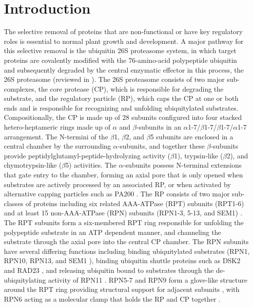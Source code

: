 \section{Introduction}
	The selective removal of proteins that are non-functional or have key regulatory roles is essential to normal plant growth and development. A major pathway for this selective removal is the ubiquitin 26S proteasome system, in which target proteins are covalently modified with the 76-amino-acid polypeptide ubiquitin and subsequently degraded by the central enzymatic effector in this process, the 26S proteasome (reviewed in \citep{finley09, livneh16, vierstra09}). The 26S proteasome consists of two major sub-complexes, the core protease (CP), which is responsible for degrading the substrate, and the regulatory particle (RP), which caps the CP at one or both ends and is responsible for recognizing and unfolding ubiquitylated substrates. Compositionally, the CP is made up of 28 subunits configured into four stacked hetero-heptameric rings made up of $\alpha$ and $\beta$-subunits in an $\alpha$1-7/$\beta$1-7/$\beta$1-7/$\alpha$1-7 arrangement. The N-termini of the $\beta$1, $\beta$2, and $\beta$5 subunits are enclosed in a central chamber by the surrounding $\alpha$-subunits, and together these $\beta$-subunits provide peptidylglutamyl-peptide-hydrolyzing activity ($\beta$1), trypsin-like ($\beta$2), and chymotrypsin-like ($\beta$5) activities. The $\alpha$-subunits possess N-terminal extensions that gate entry to the chamber, forming an axial pore that is only opened when substrates are actively processed by an associated RP, or when activated by alternative capping particles such as PA200 \citep{dange11, sadre-bazzaz10}. 
The RP consists of two major sub-classes of proteins including six related AAA-ATPase (RPT) subunits (RPT1-6) and at least 15 non-AAA-ATPase (RPN) subunits (RPN1-3, 5-13, and SEM1) \citep{finley09, paraskevopoulos14, russell13}. The RPT subunits form a six-membered RPT ring responsible for unfolding the polypeptide substrate in an ATP dependent manner, and channeling the substrate through the axial pore into the central CP chamber. The RPN subunits have several differing functions including binding ubiquitylated substrates (RPN1, RPN10, RPN13, and SEM1 \citep{elsasser04, paraskevopoulos14, schreiner08, shi16}), binding ubiquitin shuttle proteins such as DSK2 and RAD23 \citep{elsasser02, farmer10, fatimababy10, lin11}, and releasing ubiquitin bound to substrates through the de-ubiquitylating activity of RPN11 \citep{verma02, yao02}.  RPN5-7 and RPN9 form a glove-like structure around the RPT ring providing structural support for adjacent subunits \citep{lander12, lasker12, unverdorben14}, with RPN6 acting as a molecular clamp that holds the RP and CP together \citep{pathare12}.
